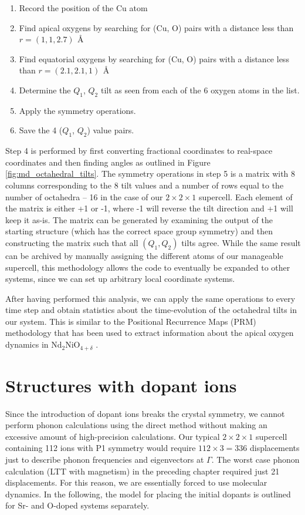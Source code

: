 \begin{enumerate}
	\item Record the position of the Cu atom
	\item Find apical oxygens by searching for (Cu, O) pairs with a distance less than $r = (1,1,2.7) \, \SI{}{\angstrom}$
	\item Find equatorial oxygens by searching for (Cu, O) pairs with a distance less than $r = (2.1,2.1,1) \, \SI{}{\angstrom}$
	\item Determine the $Q_1$, $Q_2$ tilt as seen from each of the 6 oxygen atoms in the list.
	\item Apply the symmetry operations.
	\item Save the 4 ($Q_1$, $Q_2$) value pairs.
\end{enumerate}

\noindent Step 4 is performed by first converting fractional coordinates to real-space coordinates and then finding angles as outlined in Figure \ref{fig:md_octahedral_tilts}. The symmetry operations in step 5 is a matrix with 8 columns corresponding to the 8 tilt values and a number of rows equal to the number of octahedra -- 16 in the case of our $2 \times 2 \times 1$ supercell. Each element of the matrix is either +1 or -1, where -1 will reverse the tilt direction and +1 will keep it as-is. The matrix can be generated by examining the output of the starting structure (which has the correct space group symmetry) and then constructing the matrix such that all $(Q_1, Q_2)$ tilts agree. While the same result can be archived by manually assigning the different atoms of our manageable supercell, this methodology allows the code to eventually be expanded to other systems, since we can set up arbitrary local coordinate systems.

After having performed this analysis, we can apply the same operations to every time step and obtain statistics about the time-evolution of the octahedral tilts in our system. This is similar to the Positional Recurrence Maps (PRM) methodology \cite{Piovano2016} that has been used to extract information about the apical oxygen dynamics in Nd$_2$NiO$_{4+\delta}$ \cite{Perrichon2015}.

\section{Structures with dopant ions}
Since the introduction of dopant ions breaks the crystal symmetry, we cannot perform phonon calculations using the direct method without making an excessive amount of high-precision calculations. Our typical $2 \times 2 \times 1$ supercell containing 112 ions with P1 symmetry would require $112 \times 3 = 336$ displacements just to describe phonon frequencies and eigenvectors at $\Gamma$. The worst case phonon calculation (LTT with magnetism) in the preceding chapter required just 21 displacements. For this reason, we are essentially forced to use molecular dynamics. In the following, the model for placing the initial dopants is outlined for Sr- and O-doped systems separately.

